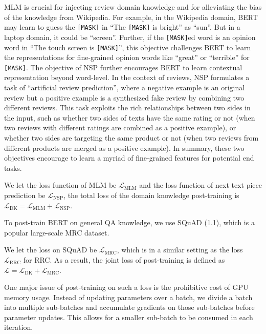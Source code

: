 MLM is crucial for injecting review domain knowledge and for alleviating the bias of the knowledge from Wikipedia. 
For example, in the Wikipedia domain, BERT may learn to guess the \texttt{[MASK]} in ``The \texttt{[MASK]} is bright'' as ``sun''. But in a laptop domain, it could be ``screen''.
Further, if the \texttt{[MASK]}ed word is an opinion word in ``The touch screen is \texttt{[MASK]}'', this objective challenges BERT to learn the representations for fine-grained opinion words like ``great'' or ``terrible'' for \texttt{[MASK]}.
The objective of NSP further encourages BERT to learn contextual representation beyond word-level.
In the context of reviews, NSP formulates a task of ``artificial review prediction'', where a negative example is an original review but a positive example is a synthesized fake review by combining two different reviews.
This task exploits the rich relationships between two sides in the input, such as whether two sides of texts have the same rating or not (when two reviews with different ratings are combined as a positive example), or whether two sides are targeting the same product or not (when two reviews from different products are merged as a positive example).
In summary, these two objectives encourage to learn a myriad of fine-grained features for potential end tasks. 

We let the loss function of MLM be $\mathcal{L}_{\text{MLM}}$ and the loss function of next text piece prediction be $\mathcal{L}_{\text{NSP}}$, the total loss of the domain knowledge post-training is $\mathcal{L}_{\text{DK}}=\mathcal{L}_{\text{MLM}} + \mathcal{L}_{\text{NSP}} $.

To post-train BERT on general QA knowledge, we use SQuAD (1.1), which is a popular large-scale MRC dataset.

We let the loss on SQuAD be $\mathcal{L}_{\text{MRC}}$, which is in a similar setting as the loss $\mathcal{L}_{\text{RRC}}$ for RRC.
As a result, the joint loss of post-training is defined as $\mathcal{L}=\mathcal{L}_{\text{DK}} + \mathcal{L}_{\text{MRC}}$.

One major issue of post-training on such a loss is the prohibitive cost of GPU memory usage.
Instead of updating parameters over a batch, we divide a batch into multiple sub-batches and accumulate gradients on those sub-batches before parameter updates. This allows for a smaller sub-batch to be consumed in each iteration.

